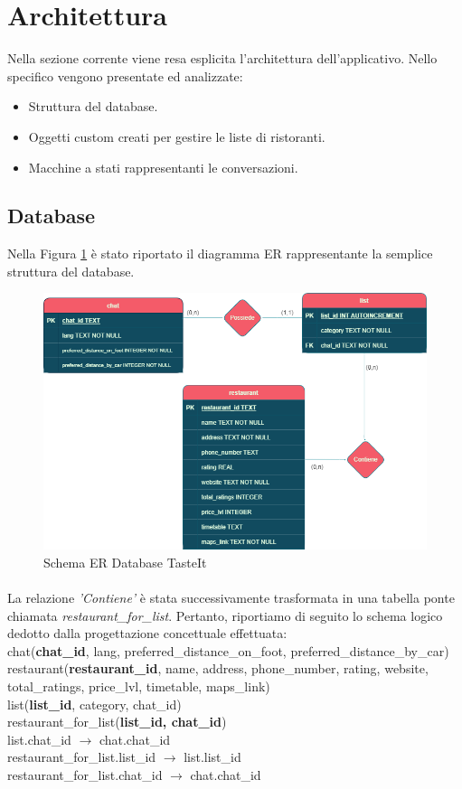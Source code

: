 \documentclass[a4paper, 12pt]{article}
\begin{document}
	\newpage
	\section{Architettura}
	Nella sezione corrente viene resa esplicita l'architettura dell'applicativo. Nello specifico vengono presentate ed analizzate:
	\begin{itemize}
		\item Struttura del database.
		\item Oggetti custom creati per gestire le liste di ristoranti.
		\item Macchine a stati rappresentanti le conversazioni.
	\end{itemize}
	\subsection{Database}
	Nella Figura \ref{fig:ER_image} è stato riportato il diagramma ER rappresentante la semplice struttura del database.
	\begin{figure}[h!]
		\centering
		\includegraphics[scale=0.62]{tasteItDb.png}
		\caption{Schema ER Database TasteIt}
		\label{fig:ER_image}
	\end{figure}
	\paragraph{}
	La relazione \textit{'Contiene'} è stata successivamente trasformata in una tabella ponte chiamata \textit{restaurant\_for\_list}.
	Pertanto, riportiamo di seguito lo schema logico dedotto dalla progettazione concettuale effettuata:\\
	chat(\textbf{chat\_id}, lang, preferred\_distance\_on\_foot, preferred\_distance\_by\_car)\\
	restaurant(\textbf{restaurant\_id}, name, address, phone\_number, rating, website, total\_ratings, price\_lvl, timetable, maps\_link)\\
	list(\textbf{list\_id}, category, chat\_id)\\
	restaurant\_for\_list(\textbf{list\_id, chat\_id})\\
	list.chat\_id $\rightarrow$ chat.chat\_id\\
	restaurant\_for\_list.list\_id $\rightarrow$ list.list\_id\\
	restaurant\_for\_list.chat\_id $\rightarrow$ chat.chat\_id
	
\end{document}
